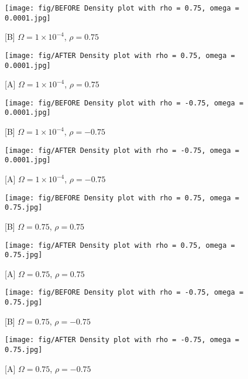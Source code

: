 \documentclass[12pt]{article}
\begin{document}
    \begin{figure}[ht]
    \centering
    \begin{minipage}{0.45\textwidth}
        \centering
        \texttt{[image: fig/BEFORE Density plot with rho = 0.75, omega = 0.0001.jpg]}
        \caption{[B] \(\Omega = 1 \times 10^{-4}\), \(\rho = 0.75\)}
    \end{minipage}
    \hfill
    \begin{minipage}{0.4\textwidth}
        \centering
        \texttt{[image: fig/AFTER Density plot with rho = 0.75, omega = 0.0001.jpg]}
        \caption{[A] \(\Omega = 1 \times 10^{-4}\), \(\rho = 0.75\)}
    \end{minipage}

    \vspace{1em}

    \begin{minipage}{0.4\textwidth}
        \centering
        \texttt{[image: fig/BEFORE Density plot with rho = -0.75, omega = 0.0001.jpg]}
        \caption{[B] \(\Omega  = 1 \times 10^{-4}\), \(\rho = -0.75\)}
    \end{minipage}
    \hfill
    \begin{minipage}{0.4\textwidth}
        \centering
        \texttt{[image: fig/AFTER Density plot with rho = -0.75, omega = 0.0001.jpg]}
        \caption{[A] \(\Omega = 1 \times 10^{-4}\), \(\rho = -0.75\)}
    \end{minipage}

    \vspace{1em}

    \begin{minipage}{0.4\textwidth}
        \centering
        \texttt{[image: fig/BEFORE Density plot with rho = 0.75, omega = 0.75.jpg]}
        \caption{[B] \(\Omega = 0.75\), \(\rho = 0.75\)} \label{fig: before change, 0.75 omega and 0.75 rho}
    \end{minipage}
    \hfill
    \begin{minipage}{0.4\textwidth}
        \centering
        \texttt{[image: fig/AFTER Density plot with rho = 0.75, omega = 0.75.jpg]} 
        \caption{[A] \(\Omega = 0.75\), \(\rho = 0.75\)} \label{fig: after change, 0.75 omega and 0.75 rho}
    \end{minipage}

    \vspace{1em}

    \begin{minipage}{0.4\textwidth}
        \centering
        \texttt{[image: fig/BEFORE Density plot with rho = -0.75, omega = 0.75.jpg]}
        \caption{[B] \(\Omega = 0.75\), \(\rho = -0.75\)} \label{fig: before change, 0.75 omega and -0.75 rho}
    \end{minipage}
    \hfill
    \begin{minipage}{0.4\textwidth}
        \centering
        \texttt{[image: fig/AFTER Density plot with rho = -0.75, omega = 0.75.jpg]}
        \caption{[A] \(\Omega = 0.75\), \(\rho = -0.75\)} \label{fig: after change, 0.75 omega and -0.75 rho}
    \end{minipage}
\end{figure}
\end{document}
